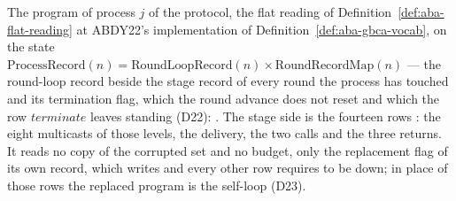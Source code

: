 \begin{definition}
  \label{def:aba-procnet}
  \leanok
  The program of process $j$ of the protocol, the flat reading of Definition~\ref{def:aba-flat-reading} at ABDY22's implementation of Definition~\ref{def:aba-gbca-vocab}, on the state $\mathrm{ProcessRecord}(n) = \mathrm{RoundLoopRecord}(n) \times \mathrm{RoundRecordMap}(n)$ --- the round-loop record beside the stage record of every round the process has touched and its termination flag, which the round advance does not reset and which the row $terminate$ leaves standing (D22): .
  The stage side is the fourteen rows : the eight multicasts of those levels, the delivery, the two calls and the three returns.
  It reads no copy of the corrupted set and no budget, only the replacement flag  of its own record, which  writes and every other row requires to be down; in place of those rows the replaced program is the self-loop  (D23).
\end{definition}
